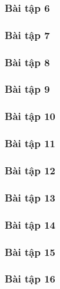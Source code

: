 \documentclass[a4paper]{article}
\begin{document}
\clearpage
\subsubsection{Bài tập 6}

\clearpage
\subsubsection{Bài tập 7}

\clearpage
\subsubsection{Bài tập 8}

\clearpage
\subsubsection{Bài tập 9}

\clearpage
\subsubsection{Bài tập 10}

\clearpage
\subsubsection{Bài tập 11}

\clearpage
\subsubsection{Bài tập 12}

\clearpage
\subsubsection{Bài tập 13}

\clearpage
\subsubsection{Bài tập 14}

\clearpage
\subsubsection{Bài tập 15}

\clearpage
\subsubsection{Bài tập 16}
\end{document}
